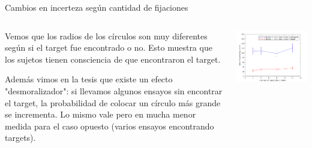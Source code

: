 \documentclass[compress]{beamer}
\begin{document}





\begin{frame}{Cambios en incerteza según cantidad de fijaciones}
\centering
  \begin{columns}[T]
    \begin{column}{.4\textwidth}

        {\scriptsize

        Vemos que los radios de los círculos son muy diferentes según si el target fue encontrado o no. Esto muestra que los sujetos tienen consciencia de que encontraron el target. \\ \bigskip

        Además vimos en la tesis que existe un efecto "desmoralizador": si llevamos algunos ensayos sin encontrar el target, la probabilidad de colocar un círculo más grande se incrementa. Lo mismo vale pero en mucha menor medida para el caso opuesto (varios ensayos encontrando targets). \par}


    \end{column}
    \begin{column}{.6\textwidth}
        \begin{center}
        \centering
        \includegraphics[width=\linewidth]{images/mean_circle_size.png}
        \end{center}
    \end{column}
  \end{columns}
\end{frame}
\end{document}
